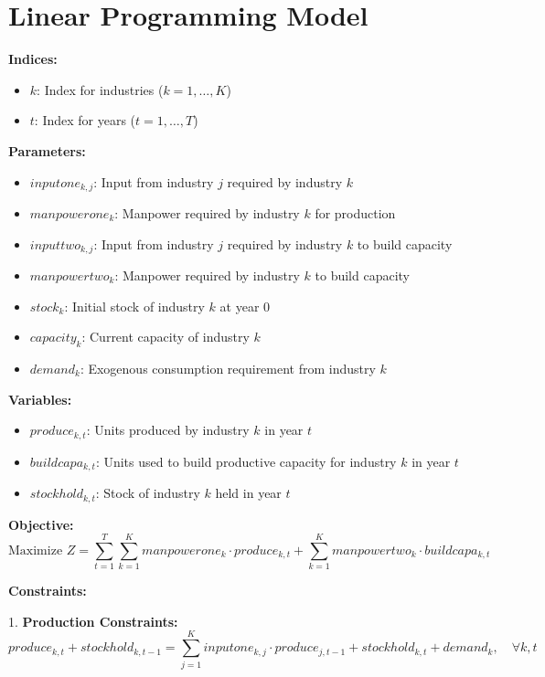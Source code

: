 \documentclass{article}
\begin{document}
\section*{Linear Programming Model}

\textbf{Indices:}
\begin{itemize}
    \item $k$: Index for industries ($k = 1, \ldots, K$)
    \item $t$: Index for years ($t = 1, \ldots, T$)
\end{itemize}

\textbf{Parameters:}
\begin{itemize}
    \item $inputone_{k, j}$: Input from industry $j$ required by industry $k$
    \item $manpowerone_{k}$: Manpower required by industry $k$ for production
    \item $inputtwo_{k, j}$: Input from industry $j$ required by industry $k$ to build capacity
    \item $manpowertwo_{k}$: Manpower required by industry $k$ to build capacity
    \item $stock_{k}$: Initial stock of industry $k$ at year 0
    \item $capacity_{k}$: Current capacity of industry $k$
    \item $demand_{k}$: Exogenous consumption requirement from industry $k$
\end{itemize}

\textbf{Variables:}
\begin{itemize}
    \item $produce_{k, t}$: Units produced by industry $k$ in year $t$
    \item $buildcapa_{k, t}$: Units used to build productive capacity for industry $k$ in year $t$
    \item $stockhold_{k, t}$: Stock of industry $k$ held in year $t$
\end{itemize}

\textbf{Objective:} 
\[
\text{Maximize } Z = \sum_{t=1}^{T} \sum_{k=1}^{K} manpowerone_{k} \cdot produce_{k, t} + \sum_{k=1}^{K} manpowertwo_{k} \cdot buildcapa_{k, t}
\]

\textbf{Constraints:}

1. \textbf{Production Constraints:}\\
\[
produce_{k, t} + stockhold_{k, t-1} = \sum_{j=1}^{K} inputone_{k, j} \cdot produce_{j, t-1} + stockhold_{k, t} + demand_{k}, \quad \forall k, t
\]
\end{document}
